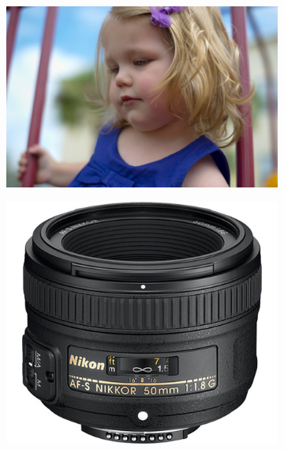 \documentclass[a4paper, 12pt]{paper}
\begin{document}
\begin{figure}[H]
    \centering
    \begin{subfigure}[t]{0.4\textwidth}
        \includegraphics[width=\textwidth]{img/kid}
    \end{subfigure}
    \begin{subfigure}[t]{0.3\textwidth}
        \includegraphics[width=\textwidth]{img/objective}
    \end{subfigure}
\label{fig:nikon}
\end{figure}
\end{document}
